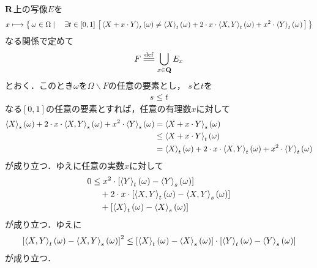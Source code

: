	\begin{sketch}
		$\mathbf{R}$上の写像$E$を
		\begin{align}
			x \longmapsto \Set{\omega \in \Omega}{\exists t \in [0,1]\, \left[\, 
			\inprod<X+x \cdot Y>_{t}(\omega) \neq
			\inprod<X>_{t}(\omega) + 2 \cdot x \cdot \inprod<X,Y>_{t}(\omega)
			+ x^{2} \cdot \inprod<Y>_{t}(\omega)\, \right]}
		\end{align}
		なる関係で定めて
		\begin{align}
			F \defeq \bigcup_{x \in \Q} E_{x}
		\end{align}
		とおく．このとき$\omega$を$\Omega \backslash F$の任意の要素とし，
		$s$と$t$を
		\begin{align}
			s \leq t
		\end{align}
		なる$[0,1]$の任意の要素とすれば，任意の有理数$x$に対して
		\begin{align}
			\inprod<X>_{s}(\omega) + 2 \cdot x \cdot \inprod<X,Y>_{s}(\omega)
			+ x^{2} \cdot \inprod<Y>_{s}(\omega)
			&= \inprod<X+x \cdot Y>_{s}(\omega) \\
			&\leq \inprod<X+x \cdot Y>_{t}(\omega) \\
			&= \inprod<X>_{t}(\omega) + 2 \cdot x \cdot \inprod<X,Y>_{t}(\omega)
			+ x^{2} \cdot \inprod<Y>_{t}(\omega)
		\end{align}
		が成り立つ．ゆえに任意の実数$x$に対して
		\begin{align}
			0 &\leq x^{2} \cdot \left[\inprod<Y>_{t}(\omega) - \inprod<Y>_{s}(\omega) \right] \\
			&\quad + 2 \cdot x \cdot \left[\inprod<X,Y>_{t}(\omega) - \inprod<X,Y>_{s}(\omega) \right] \\
			&\quad + \left[\inprod<X>_{t}(\omega) - \inprod<X>_{s}(\omega) \right]
		\end{align}
		が成り立つ．ゆえに
		\begin{align}
			\left[\inprod<X,Y>_{t}(\omega) - \inprod<X,Y>_{s}(\omega)\right]^{2}
			\leq \left[\inprod<X>_{t}(\omega) - \inprod<X>_{s}(\omega)\right] \cdot
			\left[\inprod<Y>_{t}(\omega) - \inprod<Y>_{s}(\omega)\right]
		\end{align}
		が成り立つ．
		\QED
	\end{sketch}
	